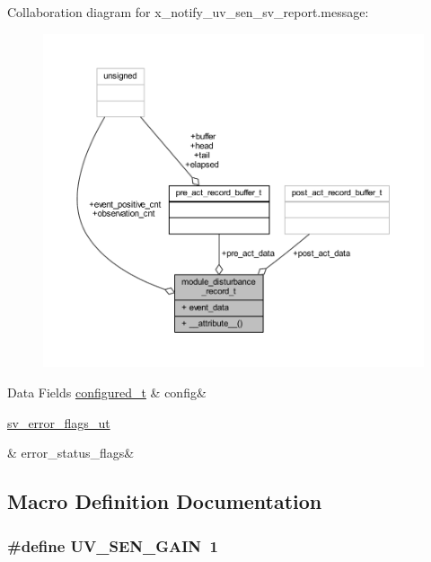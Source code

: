 Collaboration diagram for x\+\_\+notify\+\_\+uv\+\_\+sen\+\_\+sv\+\_\+report.\+message\+:\nopagebreak
\begin{figure}[H]
\begin{center}
\leavevmode
\includegraphics[width=350pt]{df/d9a/a01715}
\end{center}
\end{figure}
\begin{DoxyFields}{Data Fields}
\hypertarget{a00020_a2245023265ae4cf87d02c8b6ba991139}{\hyperlink{a00021_d6/d9c/a00352}{configured\+\_\+t}}\label{a00020_a2245023265ae4cf87d02c8b6ba991139}
&
config&
\\
\hline

\hypertarget{a00020_a150dd23606edacb55873c2c2cd06807d}{\hyperlink{a00022_d2/d5a/a00792}{sv\+\_\+error\+\_\+flags\+\_\+ut}}\label{a00020_a150dd23606edacb55873c2c2cd06807d}
&
error\+\_\+status\+\_\+flags&
\\
\hline

\end{DoxyFields}


\subsection{Macro Definition Documentation}
\hypertarget{a00020_a6ec94a6db817afee9f5fe1f0753d18bd}{
\subsubsection[{U\+V\+\_\+\+S\+E\+N\+\_\+\+G\+A\+I\+N}]{\setlength{\rightskip}{0pt plus 5cm}\#define U\+V\+\_\+\+S\+E\+N\+\_\+\+G\+A\+I\+N~1}}\label{a00020_a6ec94a6db817afee9f5fe1f0753d18bd}


